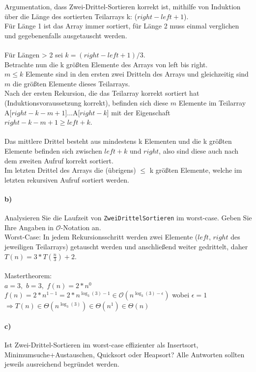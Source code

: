 \documentclass[paper=a4, fontsize=11pt]{scrartcl}
\numberwithin{equation}{section}
\numberwithin{figure}{section}
\numberwithin{table}{section}
\begin{document}
Argumentation, dass Zwei-Drittel-Sortieren korrekt ist, mithilfe von Induktion über die Länge des sortierten Teilarrays k: ($right-left+1$).\\
Für Länge 1 ist das Array immer sortiert, für Länge 2 muss einmal verglichen und gegebenenfalls ausgetauscht werden.\\
\\
Für Längen > 2 sei $k = (right-left+1)/3$.\\
Betrachte nun die k größten Elemente des Arrays von left bis right.\\
$m \leq k$ Elemente sind in den ersten zwei Dritteln des Arrays und gleichzeitig sind $m$ die größten Elemente dieses Teilarrays.\\
Nach der ersten Rekursion, die das Teilarray korrekt sortiert hat (Induktionsvoraussetzung korrekt), befinden sich diese $m$ Elemente im Teilarray A[$right-k-m+1$]...A[$right-k$] mit der Eigenschaft $right-k-m+1 \geq left+k$.\\
\\
Das mittlere Drittel besteht aus mindestens k Elementen und die k größten Elemente befinden sich zwischen $left + k$ und $right$, also sind diese auch nach dem zweiten Aufruf korrekt sortiert.\\
Im letzten Drittel des Arrays die (übrigens) $\leq$ k größten Elemente, welche im letzten rekursiven Aufruf sortiert werden.

\paragraph{b)}
Analysieren Sie die Laufzeit von \texttt{ZweiDrittelSortieren} im worst-case. Geben Sie Ihre Angaben in $\mathcal{O}$-Notation an. \\

Worst-Case: In jedem Rekursionsschritt werden zwei Elemente ($left$, $right$ des jeweiligen Teilarrays) getauscht werden und anschließend weiter gedrittelt, daher $T(n) = 3*T(\frac{n}{3})+2$.\\
\\
Mastertheorem:\\
$a = 3,$ $b= 3,$ $f(n) = 2*n^0$\\
$f(n) = 2*n^{1-1} = 2*n^{\log_3(3)-1} \in \mathcal{O}(n^{\log_3(3)-\epsilon})$ wobei $\epsilon = 1$\\
$\Rightarrow T(n) \in \Theta(n^{\log_3(3)}) \in \Theta(n^1) \in \Theta(n)$

\paragraph{c)}
Ist Zwei-Drittel-Sortieren im worst-case effizienter als Insertsort, Minimumsuche+Austauschen, Quicksort oder Heapsort? Alle Antworten sollten jeweils ausreichend begründet werden. \\
\end{document}
